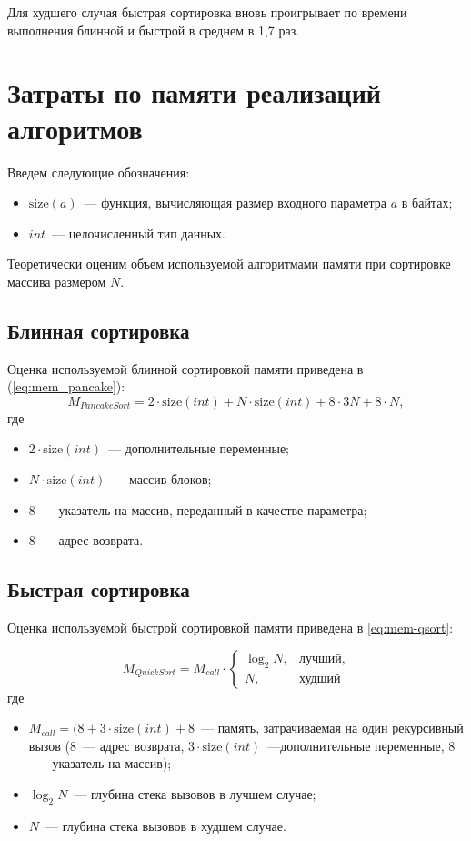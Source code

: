Для худшего случая быстрая сортировка вновь проигрывает по времени выполнения блинной и быстрой в среднем в 1,7 раз.

\section{Затраты по памяти реализаций алгоритмов}

Введем следующие обозначения:
\begin{itemize}
	\item $\text{size}(a)$~--- функция, вычисляющая размер входного параметра $a$ в байтах;
	\item $int$~--- целочисленный тип данных.
\end{itemize}

Теоретически оценим объем используемой алгоритмами памяти при сортировке массива размером $N$.

\subsection{Блинная сортировка}
Оценка используемой блинной сортировкой памяти приведена в (\ref{eq:mem_pancake}):
\begin{equation}
	\label{eq:mem_pancake}
	M_{PancakeSort} = 2 \cdot \text{size}(int) + N \cdot \text{size}(int) + 8 \cdot 3N + 8 \cdot N,
\end{equation}
где
\begin{itemize}
	\item $2 \cdot \text{size}(int)$~--- дополнительные переменные;
	\item $N \cdot \text{size}(int)$~--- массив блоков;
	\item $8$~--- указатель на массив, переданный в качестве параметра;
	\item $8$~--- адрес возврата.
\end{itemize}

\subsection{Быстрая сортировка}

Оценка используемой быстрой сортировкой памяти приведена в \ref{eq:mem-qsort}:

\begin{equation}
	\label{eq:mem-qsort}
	M_{QuickSort} = M_{call} \cdot
	\begin{cases}
		\log_2{N}, & \text{лучший}, \\
		N, & \text{худший}
	\end{cases}
\end{equation}
где
\begin{itemize}
	\item $M_{call} = (8 + 3 \cdot \text{size}(int) + 8$~--- память, затрачиваемая на один рекурсивный вызов ($8$~--- адрес возврата, $3 \cdot \text{size}(int)$~---дополнительные переменные, $8$~--- указатель на массив);
	\item $\log_2{N}$~--- глубина стека вызовов в лучшем случае;
	\item $N$~--- глубина стека вызовов в худшем случае.
\end{itemize}


